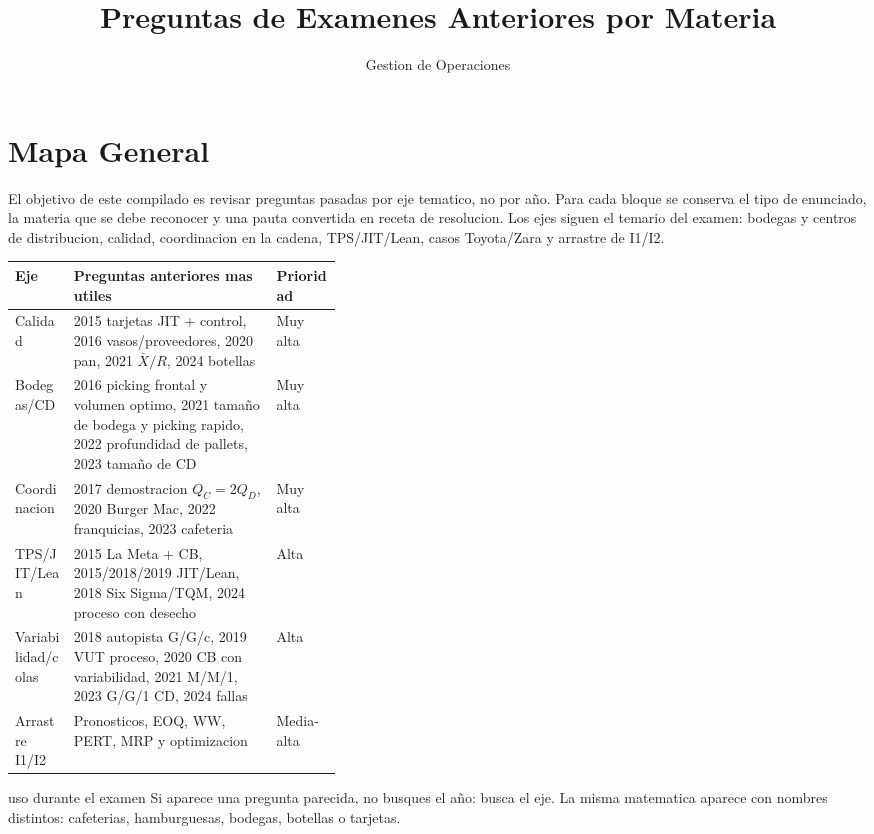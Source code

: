 \documentclass[11pt]{article}
\title{\textbf{Preguntas de Examenes Anteriores por Materia}}
\author{Gestion de Operaciones}
\date{}
\begin{document}
\maketitle
\tableofcontents
\newpage

\section{Mapa General}

El objetivo de este compilado es revisar preguntas pasadas por eje tematico, no por año. Para cada bloque se conserva el tipo de enunciado, la materia que se debe reconocer y una pauta convertida en receta de resolucion. Los ejes siguen el temario del examen: bodegas y centros de distribucion, calidad, coordinacion en la cadena, TPS/JIT/Lean, casos Toyota/Zara y arrastre de I1/I2.

\begin{center}
\begin{tabularx}{\linewidth}{p{0.18\linewidth}X p{0.20\linewidth}}
\toprule
Eje & Preguntas anteriores mas utiles & Prioridad \\
\midrule
Calidad & 2015 tarjetas JIT + control, 2016 vasos/proveedores, 2020 pan, 2021 $\bar X/R$, 2024 botellas & Muy alta \\
Bodegas/CD & 2016 picking frontal y volumen optimo, 2021 tamaño de bodega y picking rapido, 2022 profundidad de pallets, 2023 tamaño de CD & Muy alta \\
Coordinacion & 2017 demostracion $Q_C=2Q_D$, 2020 Burger Mac, 2022 franquicias, 2023 cafeteria & Muy alta \\
TPS/JIT/Lean & 2015 La Meta + CB, 2015/2018/2019 JIT/Lean, 2018 Six Sigma/TQM, 2024 proceso con desecho & Alta \\
Variabilidad/colas & 2018 autopista G/G/c, 2019 VUT proceso, 2020 CB con variabilidad, 2021 M/M/1, 2023 G/G/1 CD, 2024 fallas & Alta \\
Arrastre I1/I2 & Pronosticos, EOQ, WW, PERT, MRP y optimizacion & Media-alta \\
\bottomrule
\end{tabularx}
\end{center}

\begin{alerta}{uso durante el examen}
Si aparece una pregunta parecida, no busques el año: busca el eje. La misma matematica aparece con nombres distintos: cafeterias, hamburguesas, bodegas, botellas o tarjetas.
\end{alerta}








\end{document}

